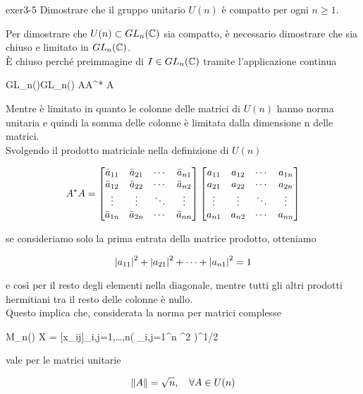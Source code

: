 {exer3-5}
{
Dimostrare che il gruppo unitario $ U(n) $ è compatto per ogni $ n \geqslant 1 $.
}
{
Per dimostrare che $ U(n) \subset GL_{n}(\mathbb{C}) $ sia compatto, è necessario dimostrare che sia chiuso e limitato in $ GL_{n}(\mathbb{C}) $. \\
È chiuso perché preimmagine di $ I \in GL_{n}(\mathbb{C}) $ tramite l'applicazione continua

	{GL_{n}(\C)}{GL_{n}(\C)}
	{A}{A^{*} A}

Mentre è limitato in quanto le colonne delle matrici di $ U(n) $ hanno norma unitaria e quindi la somma delle colonne è limitata dalla dimensione n delle matrici. \\
Svolgendo il prodotto matriciale nella definizione di $ U(n) $

\begin{equation}
	A^{*} A = %
	\bmqty{ %
			\bar{a}_{11} & \bar{a}_{21} & \cdots & \bar{a}_{n1} \\ %
			\bar{a}_{12} & \bar{a}_{22} & \cdots & \bar{a}_{n2} \\ %
			\vdots & \vdots & \ddots & \vdots \\ %
			\bar{a}_{1n} & \bar{a}_{2n} & \cdots & \bar{a}_{nn}
			}
	\bmqty{ %
			a_{11} & a_{12} & \cdots & a_{1n} \\ %
			a_{21} & a_{22} & \cdots& a_{2n} \\ %
			\vdots & \vdots & \ddots & \vdots \\ %
			a_{n1} & a_{n2} & \cdots & a_{nn}
			}
\end{equation}

se consideriamo solo la prima entrata della matrice prodotto, otteniamo

\begin{equation}
	\abs{a_{11}}^{2} + \abs{a_{21}}^{2} + \cdots + \abs{a_{n1}}^{2} = 1
\end{equation}

e così per il resto degli elementi nella diagonale, mentre tutti gli altri prodotti hermitiani tra il resto delle colonne è nullo. \\
Questo implica che, considerata la norma per matrici complesse

\map{\norm{}}
	{M_{n}(\C)}{\R}
	{X = [x_{ij}]_{i,j=1,\dots,n}}{\left( \sum_{i,j=1}^{n} ^{2} \right)^{1/2}}

vale per le matrici unitarie

\begin{equation}
	\norm{A} = \sqrt{n} \qcomma \forall A \in U(n)
\end{equation}
}

